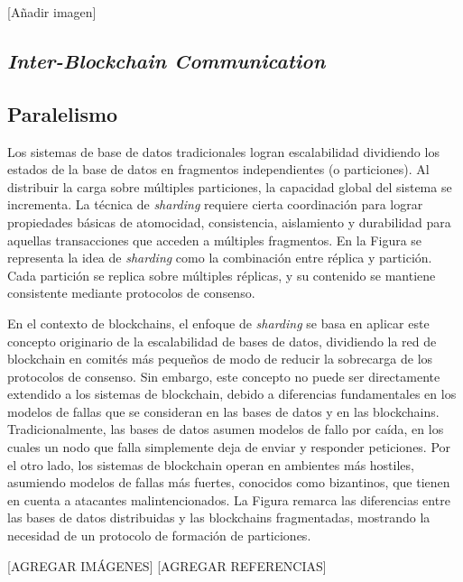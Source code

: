 [Añadir imagen]
\subsection{\emph{Inter-Blockchain Communication}}

\subsection{Paralelismo}
Los sistemas de base de datos tradicionales logran escalabilidad dividiendo
los estados de la base de datos en fragmentos independientes (o particiones).
%
Al distribuir la carga sobre múltiples particiones, la capacidad global del sistema
se incrementa.
%
La técnica de \emph{sharding} requiere cierta coordinación para lograr propiedades
básicas de atomocidad, consistencia, aislamiento y durabilidad para aquellas transacciones
que acceden a múltiples fragmentos.
%
En la Figura se representa la idea de \emph{sharding} como la combinación entre
réplica y partición.
%
Cada partición se replica sobre múltiples réplicas, y su contenido se mantiene consistente
mediante protocolos de consenso.

En el contexto de blockchains, el enfoque de \emph{sharding} se basa en aplicar este concepto
originario de la escalabilidad de bases de datos, dividiendo la red de blockchain en comités más
pequeños de modo de reducir la sobrecarga de los protocolos de consenso.
%
Sin embargo, este concepto no puede ser directamente extendido a los sistemas de blockchain, debido
a diferencias fundamentales en los modelos de fallas que se consideran en las bases de datos
y en las blockchains.
%
Tradicionalmente, las bases de datos asumen modelos de fallo por caída, en los cuales un nodo que falla
simplemente deja de enviar y responder peticiones.
%
Por el otro lado, los sistemas de blockchain operan en ambientes más hostiles, asumiendo modelos de fallas
más fuertes, conocidos como bizantinos, que tienen en cuenta a atacantes malintencionados.
%
La Figura remarca las diferencias entre las bases de datos distribuidas y las blockchains fragmentadas,
mostrando la necesidad de un protocolo de formación de particiones.

[AGREGAR IMÁGENES]
[AGREGAR REFERENCIAS]


